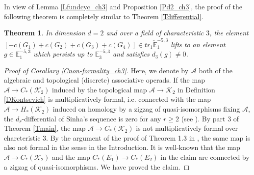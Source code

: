 \documentclass[reqno]{amsart}
\theoremstyle{definition}
\theoremstyle{plain}
\newtheorem{thm}[defi]{Theorem}
\newcommand{\CEE}{\check{\mathbb{E}}}
\newcommand{\ASS}{\mathcal{A}}%
\newcommand{\KK}{\mathcal{K}}%
\newcommand{\EE}{\mathbb{E}}
\begin{document}
In view of Lemma \ref{Lfundcyc_ch3} and Proposition  \ref{Pd2_ch3}, the proof of the following theorem is completely similar to Theorem \ref{Tdifferential}.
\begin{thm}\label{Tch3}
In dimension $d=2$ and over a field of  characteristic $3$,  the  element $[-c(G_1)+c(G_2)+c(G_3)+c(G_4)]\in tr_1\CEE^{-5,3}_1$ lifts to an element $ g\in \EE^{-5,3}_1$ which persists up to $\EE^{-5,3}_3$ and satisfies $d_3(g)\not=0$.
\hfill \qedsymbol
\end{thm}

\begin{proof}[Proof of Corollary \ref{Cnon-formality_ch3}]
Here, we denote by $\ASS$ both of the algebraic and topological (discrete) associative operads. If the map $\ASS\to C_*(\KK_2)$ induced by the topological map $\ASS\to \KK_2$ in Definition \ref{DKontsevich} is multiplicatively formal, i.e. connected with the  map $\ASS\to H_*(\KK_2)$ induced on homology by a zigzag of quasi-isomorphisms fixing $\ASS$, the $d_r$-differential of Sinha's sequence is zero for any $r\geq 2$ (see \cite{moriya}). By part 3 of Theorem \ref{Tmain}, the map $\ASS\to C_*(\KK_2)$ is not multiplicatively formal over charcteristic 3. By the argument of the proof of Theorem 1.3 in \cite{moriya}, the same map is also not formal in the sense in the Introduction. It is well-known that the map $\ASS\to C_*(\KK_2)$ and the map $C_*(E_1)\to C_*(E_2)$ in the claim are connected by a zigzag of quasi-isomorphisms. We have proved the claim.  
\end{proof}
\end{document}
